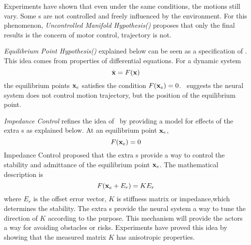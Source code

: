 Experiments have shown that even under the same conditions, the motions still vary. 
Some \dof s are not controlled and freely influenced by the environment. 
For this phenomenon, \emph{Uncontrolled Manifold Hypothesis(\umh)}\citep{latash2008neurophysiological} proposes that only the final results is the concern of motor control, trajectory is not.


\emph{Equilibrium Point Hypothesis(\eph)}\citep{feldman1986ome} explained below can be seen as a specification of \umh.
This idea comes from properties of differential equations. 
For a dynamic system
\[
\dot{\mathbf{x}}=F(\mathbf{x})
\]
the equilibrium points $\mathbf{x}_{e}$ satisfies the condition $F(\mathbf{x}_{e})=0$.
\eph\ suggests the neural system does not control motion trajectory, but the position of the equilibrium point.



\emph{Impedance Control} \citep{hogan1985ica} refines the idea of \eph\ by providing a model for effects of the extra \dof s as explained below. 
At an equilibrium point $\mathbf{x}_{e}$,
\[
F(\mathbf{x}_{e})=0 
\]
Impedance Control proposed that the extra \dof s provide a way to control the stability and admittance of the equilibrium point $\mathbf{x}_{e}$. 
The mathematical description is
\begin{equation}
F(\mathbf{x}_{e}+E_r)=KE_r
\end{equation}
where $E_r$ is the offset error vector, $K$ is stiffness matrix or impedance,which determines the stability.
The extra \dof s provide the neural system  a way to tune the direction of $K$ according to the purpose.
This mechanism will provide the actors a way for avoiding obstacles or risks. 
Experiments \citep{Franklin2007} have proved this idea by showing  that the measured matrix $K$ has anisotropic properties.







